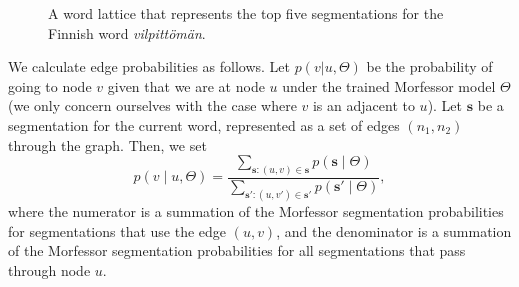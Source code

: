 \begin{figure}[!t]
  \begin{center}
    \caption{A word lattice that represents the
    top five segmentations for the Finnish word \emph{vilpitt\"om\"an}.
    }
    \label{fig:wordlattice}
  \end{center}
\end{figure}

We calculate edge probabilities as follows.
%
Let $p(v | u, \Theta)$ be the probability of going to node $v$  given that we are at node $u$ under the trained Morfessor model $\Theta$ (we only concern ourselves with the case where $v$ is an adjacent to $u$).
%
Let $\mathbf{s}$ be a segmentation for the current word, represented as a set of edges $(n_1, n_2)$ through the graph.
%
Then, we set
\[
p(v \mid u, \Theta) = \frac{\sum_{\mathbf{s} : (u, v) \in \mathbf{s}}
p(\mathbf{s} \mid \Theta)}{\sum_{\mathbf{s'} : (u, v') \in \mathbf{s'}}
p(\mathbf{s'} \mid \Theta)},
\]
where the numerator is a summation of the Morfessor segmentation probabilities for segmentations that use the edge $(u, v)$, and the denominator is a summation of the Morfessor segmentation probabilities for all segmentations that pass through node $u$.

